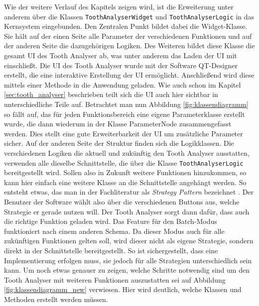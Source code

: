 Wie der weitere Verlauf des Kapitels zeigen wird, ist die Erweiterung unter anderem
über die Klassen \texttt{ToothAnalyserWidget} und \texttt{ToothAnalyserLogic} in
das Kernsystem eingebunden. Den Zentralen Punkt bildet dabei die Widget-Klasse. Sie
hält auf der einen Seite alle Parameter der verschiedenen Funktionen und auf der
anderen Seite die dazugehörigen Logiken. Des Weiteren bildet diese Klasse die
gesamt \ac{UI} des Tooth Analyser ab, was unter anderem das Laden der \ac{UI} mit
einschließt. Die \ac{UI} des Tooth Analyser wurde mit der Software QT-Designer erstellt,
die eine interaktive Erstellung der \ac{UI} ermöglicht. Anschließend wird diese
mittels einer Methode in die Anwendung geladen. Wie auch schon im Kapitel \ref{sec:tooth_analyser}
beschrieben teilt sich die \ac{UI} auch hier sichtbar in unterschiedliche Teile
auf. Betrachtet man nun Abbildung \ref{fig:klassendiagramm} so fällt auf, das
für jeden Funktionsbereich eine eigene Parameterklasse erstellt wurde, die dann wiederum
in der Klasse ParameterNode zusammengefasst werden. Dies stellt eine gute
Erweiterbarkeit der \ac{UI} um zusätzliche Parameter sicher. Auf der anderen
Seite der Struktur finden sich die Logikklassen. Die verschiedenen Logiken die aktuell
und zukünftig den Tooth Analyser ausstatten, verwenden alle dieselbe
Schnittstelle, die über die Klasse \texttt{ToothAnalyserLogic} bereitgestellt
wird. Sollen also in Zukunft weitere Funktionen hinzukommen, so kann hier
einfach eine weitere Klasse an die Schnittstelle angehängt werden. So entsteht etwas,
das man in der Fachliteratur als \textit{Strategy Pattern} bezeichnet \citep[vgl.][S.~99]{siebler2014}.
Der Benutzer der Software wählt also über die verschiedenen Buttons aus, welche
Strategie er gerade nutzen will. Der Tooth Analyser sorgt dann dafür, dass auch
die richtige Funktion geladen wird. Das Feature für den Batch-Modus funktioniert
nach einem anderen Schema. Da dieser Modus auch für alle zukünftigen Funktionen
gelten soll, wird dieser nicht als eigene Strategie, sondern direkt in der
Schnittstelle bereitgestellt. So ist sichergestellt, dass eine Implementierung
erfolgen muss, sie jedoch für alle Strategien unterschiedlich sein kann. Um noch
etwas genauer zu zeigen, welche Schritte notwendig sind um den Tooth Analyser mit
weiteren Funktionen auszustatten sei auf Abbildung \ref{fig:klassendiagramm_new}
verwiesen. Hier wird deutlich, welche Klassen und Methoden erstellt werden müssen.

